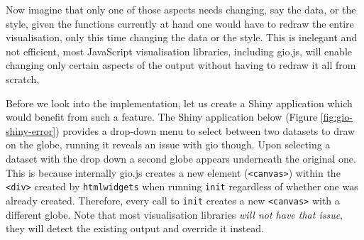 \documentclass[10pt,]{krantz}
\begin{document}
Now imagine that only one of those aspects needs changing, say the data, or the style, given the functions currently at hand one would have to redraw the entire visualisation, only this time changing the data or the style. This is inelegant and not efficient, most JavaScript visualisation libraries, including gio.js, will enable changing only certain aspects of the output without having to redraw it all from scratch.

Before we look into the implementation, let us create a Shiny application which would benefit from such a feature. The Shiny application below (Figure \ref{fig:gio-shiny-error}) provides a drop-down menu to select between two datasets to draw on the globe, running it reveals an issue with gio though. Upon selecting a dataset with the drop down a second globe appears underneath the original one. This is because internally gio.js creates a new element (\texttt{\textless{}canvas\textgreater{}}) within the \texttt{\textless{}div\textgreater{}} created by \texttt{htmlwidgets} when running \texttt{init} regardless of whether one was already created. Therefore, every call to \texttt{init} creates a new \texttt{\textless{}canvas\textgreater{}} with a different globe. Note that most visualisation libraries \emph{will not have that issue}, they will detect the existing output and override it instead.
\end{document}
